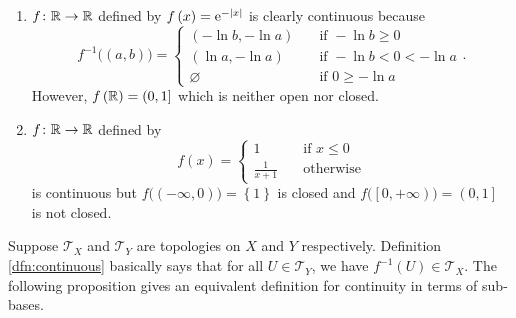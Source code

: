 \documentclass[math]{amznotes}
\theoremstyle{remark}
\newcommand{\e}{\mathrm{e}}
\begin{document}
\begin{enumerate}
    \item $f \colon \mathbb{R} \to \mathbb{R}$ defined by $f\left(x\right) = \e^{-\abs{x}}$ is clearly continuous because
    \begin{equation*}
        f^{-1}\bigl(\left(a, b\right)\bigr) = \begin{cases}
            \left(-\ln b, -\ln a\right) & \quad\textrm{if } -\ln b \geq 0 \\
            \left(\ln a, -\ln a\right) & \quad\textrm{if } -\ln b < 0 < -\ln a \\
            \varnothing & \quad\textrm{if } 0 \geq -\ln a
        \end{cases}.
    \end{equation*}
    However, $f\left(\mathbb{R}\right) = \left(0, 1\right]$ which is neither open nor closed.
    \item $f \colon \mathbb{R} \to \mathbb{R}$ defined by 
    \begin{equation*}
        f\left(x\right) = \begin{cases}
            1 & \quad\textrm{if } x \leq 0 \\
            \frac{1}{x + 1} & \quad\textrm{otherwise}
        \end{cases}
    \end{equation*}
    is continuous but $f\bigl(\left(-\infty, 0\right)\bigr) = \left\{1\right\}$ is closed and $f\bigl(\left[0, +\infty\right)\bigr) = \left(0, 1\right]$ is not closed.
\end{enumerate}
Suppose $\mathcal{T}_X$ and $\mathcal{T}_Y$ are topologies on $X$ and $Y$ respectively. Definition \ref{dfn:continuous} basically says that for all $U \in \mathcal{T}_Y$, we have $f^{-1}\left(U\right) \in \mathcal{T}_X$. The following proposition gives an equivalent definition for continuity in terms of sub-bases.
\end{document}
